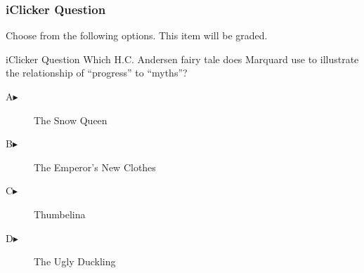 \begin{frame}
  \frametitle{iClicker Question}
Choose from the following options. This item will be graded.
\begin{block}{iClicker Question}
Which H.C. Andersen fairy tale does Marquard use to illustrate the
relationship of ``progress'' to ``myths''?
\end{block}
\begin{description}
\item[A\hspace{.2in}$\blacktriangleright$] The Snow Queen
\item[B\hspace{.2in}$\blacktriangleright$] The Emperor's New Clothes
\item[C\hspace{.2in}$\blacktriangleright$] Thumbelina
\item[D\hspace{.2in}$\blacktriangleright$] The Ugly Duckling
\end{description}
\end{frame}
